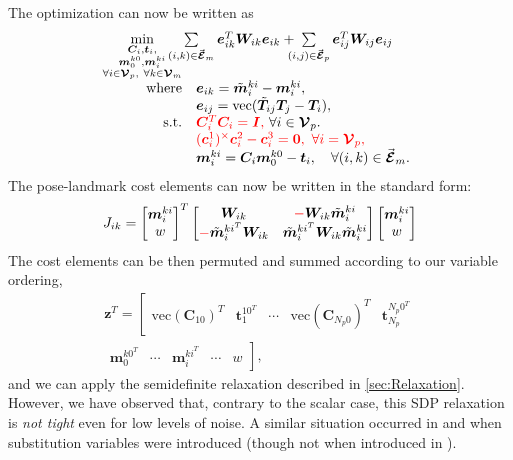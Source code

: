 \documentclass[lettersize,journal]{IEEEtran}
\newcommand{\EdgeSet}{\vec{\bm{\mathcal{E}}}}
\newcommand{\VertSetP}{\bm{\mathcal{V}}_p}
\newcommand{\VertSetM}{\bm{\mathcal{V}}_m}
\newcommand{\vect}[1]{\mbox{vec}(#1)}
\newcommand{\rev}[1]{\color{red}{#1}\color{black}}
\begin{document}
The optimization can now be written as
\begin{equation}
	\hspace*{-5pt}
	\label{opt:SLAM}
	\begin{array}{rl} 
		\min \limits_{ \substack{\bm{C}_i,\bm{t}_i, \\ \bm{m}_0^{k0},\bm{m}_i^{ki} \\ \forall i\in \VertSetP,~ \forall k\in\VertSetM } } & \hspace*{-20pt}\sum\limits_{(i,k)\in\EdgeSet_m} \bm{e}_{ik}^T \bm{W}_{ik} \bm{e}_{ik} + \hspace*{-7pt}\sum\limits_{(i,j)\in\EdgeSet_p}  \bm{e}_{ij}^T \bm{W}_{ij} \bm{e}_{ij}\hfill \\
		\mbox{where} & \bm{e}_{ik} = \tilde{\bm{m}}_i^{ki} - \bm{m}_i^{ki},\\
		&\bm{e}_{ij} = \vect{\tilde{\bm{T}}_{ij}\bm{T}_j - \bm{T}_i},\\
		\mbox{s.t.}&\rev{\bm{C}_i^T \bm{C}_i = \bm{I},}~\forall i \in \VertSetP.\\
		& \rev{(\bm{c}_i^{1})^\times\bm{c}_i^{2} - \bm{c}_i^{3} = \bm{0},~\forall i = \VertSetP,}\\
		& \bm{m}_i^{ki} = \bm{C}_i\bm{m}_0^{k0} - \bm{t}_i, \quad \forall (i,k)\in\EdgeSet_m.
	\end{array}
\end{equation}
The pose-landmark cost elements can now be written in the standard form:
\begin{equation*}
	J_{ik}=\begin{bmatrix}
		\bm{m}_i^{ki}\\w
	\end{bmatrix}^T \begin{bmatrix}
		\bm{W}_{ik} & \rev{-}\bm{W}_{ik}\tilde{\bm{m}}_i^{ki}\\
		\rev{-}\tilde{\bm{m}}_i^{ki^T}\bm{W}_{ik} & \tilde{\bm{m}}_i^{ki^T}\bm{W}_{ik}\tilde{\bm{m}}_i^{ki}
	\end{bmatrix}\begin{bmatrix}
	\bm{m}_i^{ki}\\w
	\end{bmatrix}
\end{equation*}
The cost elements can be then permuted and summed according to our variable ordering,
\begin{multline}
	\bm{z}^T = \left[\begin{matrix}\vect{\bm{C}_{10}}^T &\bm{t}_1^{10^T} & \cdots &\vect{\bm{C}_{N_p0}}^T&\bm{t}_{N_p}^{N_p0^T} \end{matrix}\right. \\
		\left.\begin{matrix} \bm{m}_0^{k0^T} &\cdots& \bm{m}_i^{ki^T} & \cdots & w \end{matrix}\right],
\end{multline}
and we can apply the semidefinite relaxation described in \ref{sec:Relaxation}. However, we have observed that, contrary to the scalar case, this SDP relaxation is \emph{not tight} even for low levels of noise. A similar situation occurred in \cite{brialesCertifiablyGloballyOptimal2018} and \cite{yangTEASERFastCertifiable2021} when substitution variables were introduced (though not when introduced in \cite{dumbgenSafeSmoothCertified2023}).
\end{document}
